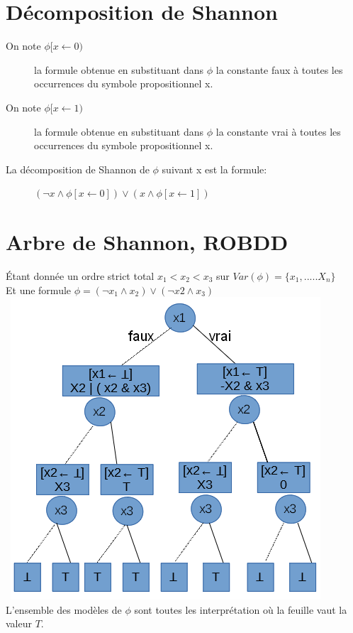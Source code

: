 \section{Décomposition de Shannon}
\begin{description}
\item[On note $\phi [x \leftarrow 0 ) $ ] la formule obtenue en substituant dans $\phi$ la constante faux à toutes les occurrences du symbole propositionnel x.
\item[On note $\phi [x \leftarrow 1 ) $ ] la formule obtenue en substituant dans $\phi$ la constante vrai à toutes les occurrences du symbole propositionnel x.
\end{description}

La décomposition de Shannon de $\phi$ suivant x est la formule:
\begin{description}
\item[] $(\neg x \wedge \phi [x \leftarrow 0]) \vee (x \wedge \phi [x \leftarrow 1])$
\end{description}

\pagebreak
\section{Arbre de Shannon, ROBDD}
Étant donnée un ordre strict total $x_1 < x_2 < x_3$ sur $Var(\phi ) = \{x_1, ..... X_n\}$\\
Et une formule $\phi = (\neg x_1 \wedge x_2) \vee ( \neg x2 \wedge x_3)$\\\
\includegraphics[scale=0.4]{img/of-arbre-shannon_1.png} \\
L'ensemble des modèles de $\phi$ sont toutes les interprétation où la feuille vaut la valeur $T$.

